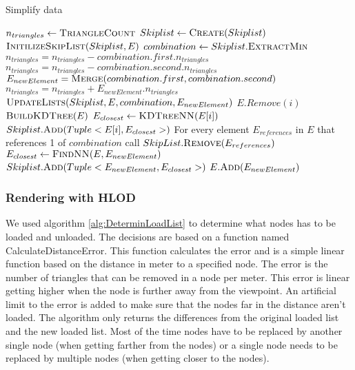 \begin{algorithm}[h]
\caption{Simplify data}\label{alg:SimplifyData}
\begin{algorithmic}[1]
 
\State {}
\State $n_{triangles} \gets \Call{TriangleCount}{}$
\State $Skiplist \gets \Call{Create}{Skiplist}$ 
\State $\Call{InitilizeSkipList}{Skiplist, E}$
    \State $combination \gets Skiplist.\Call{ExtractMin}{}$
    \State $n_{triangles} = n_{triangles} - combination.first.n_{triangles}$
    \State $n_{triangles} = n_{triangles} - combination.second.n_{triangles}$
    \State $E_{newElement} = \Call{Merge}{combination.first, combination.second}$
    \State $n_{triangles} = n_{triangles} + E_{newElement}.n_{triangles}$
    \State $\Call{UpdateLists}{Skiplist, E, combination, E_{newElement}}$
\EndWhile
\EndProcedure
{}
        \State $E.Remove(i)$
    \EndIf
\EndFor
\EndFunction
{}
\State $\Call{BuildKDTree}{E}$
    \State $E_{closest} \gets \Call{KDTreeNN}{E[i]}$ 
    \State $Skiplist.\Call{Add}{Tuple<E[i], E_{closest}>}$
\EndFor
\EndFunction
{}
\State For every element $E_{references}$ in $E$ that references 1 of $combination$ call $SkipList.\Call{Remove}{E_{references}}$
\State $E_{closest} \gets \Call{FindNN}{E, E_{newElement}}$ 
\State $Skiplist.\Call{Add}{Tuple<E_{newElement}, E_{closest}>}$
\State $E.\Call{Add}{E_{newElement}}$
\EndFunction
\end{algorithmic}
\end{algorithm}

\subsubsection{Rendering with HLOD}
We used algorithm \ref{alg:DeterminLoadList} to determine what nodes has to be loaded and unloaded. The decisions are based on a function named CalculateDistanceError. This function calculates the error and is a simple linear function based on the distance in meter to a specified node. The error is the number of triangles that can be removed in a node per meter. This error is linear getting higher when the node is further away from the viewpoint. An artificial limit to the error is added to make sure that the nodes far in the distance aren't loaded. The algorithm only returns the differences from the original loaded list and the new loaded list. Most of the time nodes have to be replaced by another single node (when getting farther from the nodes) or a single node needs to be replaced by multiple nodes (when getting closer to the nodes).

